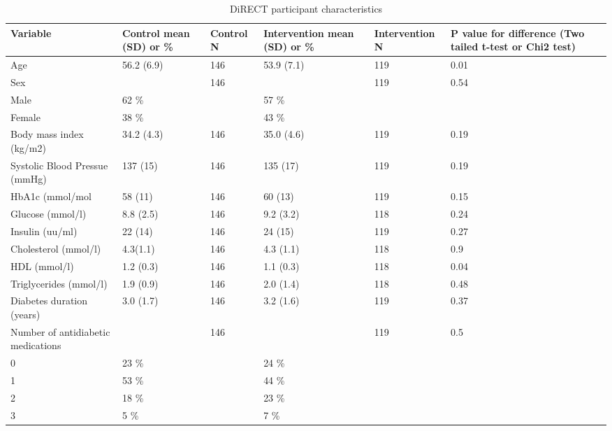 \documentclass[11pt,twoside]{bristolthesis}
\begin{document}
\begin{landscape}\begin{table}

\caption{\label{tab:DiRECT-participants}DiRECT participant characteristics}
\centering
\begin{tabu} to 
\toprule
Variable & Control mean (SD) or \% & Control N & Intervention mean (SD) or \% & Intervention N & P value for difference (Two tailed t-test or Chi2 test)\\
\midrule
Age & 56.2 (6.9) & 146 & 53.9 (7.1) & 119 & 0.01\\
Sex &  & 146 &  & 119 & 0.54\\
\hspace{1em}Male & 62 \% &  & 57 \% &  & \\
\hspace{1em}Female & 38 \% &  & 43 \% &  & \\
Body mass index (kg/m2) & 34.2 (4.3) & 146 & 35.0 (4.6) & 119 & 0.19\\
\addlinespace
Systolic Blood Pressue (mmHg) & 137 (15) & 146 & 135 (17) & 119 & 0.19\\
HbA1c (mmol/mol & 58 (11) & 146 & 60 (13) & 119 & 0.15\\
Glucose (mmol/l) & 8.8 (2.5) & 146 & 9.2 (3.2) & 118 & 0.24\\
Insulin (uu/ml) & 22 (14) & 146 & 24 (15) & 119 & 0.27\\
Cholesterol (mmol/l) & 4.3(1.1) & 146 & 4.3 (1.1) & 118 & 0.9\\
\addlinespace
HDL (mmol/l) & 1.2 (0.3) & 146 & 1.1 (0.3) & 118 & 0.04\\
Triglycerides (mmol/l) & 1.9 (0.9) & 146 & 2.0 (1.4) & 118 & 0.48\\
Diabetes duration (years) & 3.0 (1.7) & 146 & 3.2 (1.6) & 119 & 0.37\\
Number of antidiabetic medications &  & 146 &  & 119 & 0.5\\
\hspace{1em}0 & 23 \% &  & 24 \% &  & \\
\addlinespace
\hspace{1em}1 & 53 \% &  & 44 \% &  & \\
\hspace{1em}2 & 18 \% &  & 23 \% &  & \\
\hspace{1em}3 & 5 \% &  & 7 \% &  & \\

\end{tabu}
\end{table}
\end{landscape}
\end{document}
